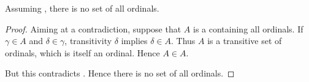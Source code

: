 \begin{theorem}\label{thm:burali_forti_paradox}
  Assuming , there is no set of all ordinals.
\end{theorem}
\begin{proof}
  Aiming at a contradiction, suppose that \( A \) is a containing all ordinals. If \( \gamma \in A \) and \( \delta \in \gamma \), transitivity \( \delta \) implies \( \delta \in A \). Thus \( A \) is a transitive set of ordinals, which  is itself an ordinal. Hence \( A \in A \).

  But this contradicts . Hence there is no set of all ordinals.
\end{proof}

